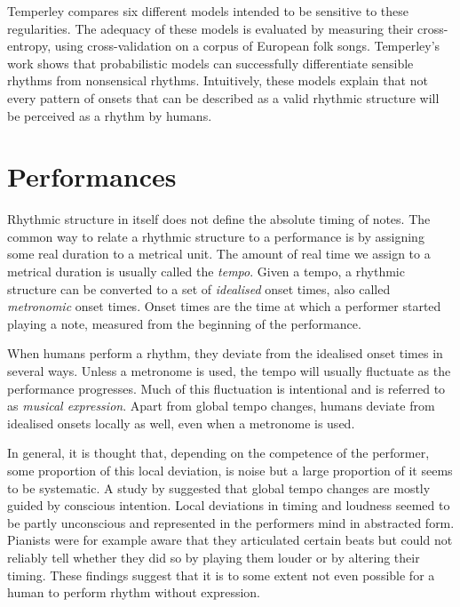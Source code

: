 Temperley compares six different models intended to be sensitive to these regularities. The adequacy of these models is evaluated by measuring their cross-entropy, using cross-validation on a corpus of European folk songs. Temperley's work shows that probabilistic models can successfully differentiate sensible rhythms from nonsensical rhythms. Intuitively, these models explain that not every pattern of onsets that can be described as a valid rhythmic structure will be perceived as a rhythm by humans. 


\section{Performances}
\label{sec:performances}

Rhythmic structure in itself does not define the absolute timing of notes. The common way to relate a rhythmic structure to a performance is by assigning some real duration to a metrical unit. The amount of real time we assign to a metrical duration is usually called the \textit{tempo}. Given a tempo, a rhythmic structure can be converted to a set of \textit{idealised} onset times, also called \textit{metronomic} onset times. Onset times are the time at which a performer started playing a note, measured from the beginning of the performance.

When humans perform a rhythm, they deviate from the idealised onset times in several ways. Unless a metronome is used, the tempo will usually fluctuate as the performance progresses. Much of this fluctuation is intentional and is referred to as \textit{musical expression}. Apart from global tempo changes, humans deviate from idealised onsets locally as well, even when a metronome is used. 

In general, it is thought that, depending on the competence of the performer, some proportion of this local deviation, is noise but a large proportion of it seems to be systematic. A study by \citet{palmer1989mapping} suggested that global tempo changes are mostly guided by conscious intention. Local deviations in timing and loudness seemed to be partly unconscious and represented in the performers mind in abstracted form. Pianists were for example aware that they articulated certain beats but could not reliably tell whether they did so by playing them louder or by altering their timing. These findings suggest that it is to some extent not even possible for a human to perform rhythm without expression.

